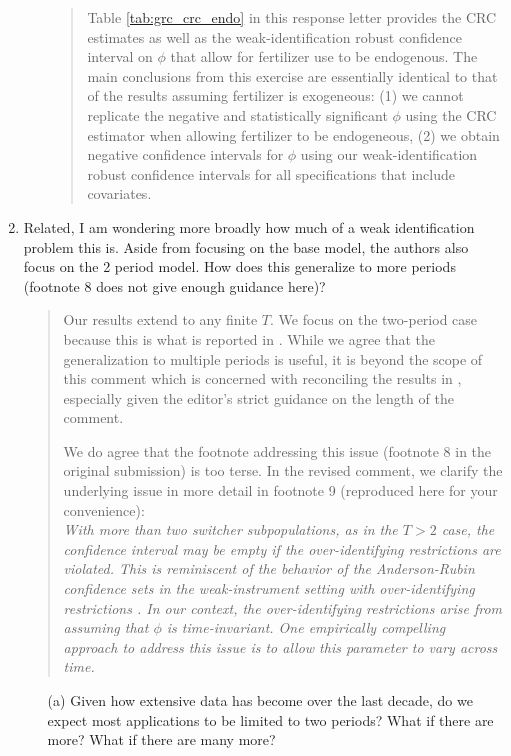 \documentclass{article}[11pt]
\begin{document}
\begin{enumerate}
\begin{itemize}
\begin{quote}
Table \ref{tab:grc_crc_endo} in this response letter provides the CRC estimates as well as the weak-identification robust confidence interval on $\phi$ that allow for fertilizer use to be endogenous. The main conclusions from this exercise are essentially identical to that of the results assuming fertilizer is exogeneous: (1) we cannot replicate the negative and statistically significant $\phi$ using the CRC estimator when allowing fertilizer to be endogeneous, (2) we obtain negative confidence intervals for $\phi$ using our weak-identification robust confidence intervals for all specifications that include covariates.
      \end{quote}
  \end{itemize}
  \item Related, I am wondering more broadly how much of a weak identification problem this is. Aside from focusing on the base model, the authors also focus on the 2 period model. How does this generalize to more periods (footnote 8 does not give enough guidance here)?
    \begin{quote}
        Our results extend to any finite $T$.
        We focus on the two-period case because this is what is reported in \citet{S2011}. While we agree that the generalization to multiple periods is useful, it is beyond the scope of this comment which is concerned with reconciling the results in \citet{S2011}, especially given the editor's strict guidance on the length of the comment. 
        \newline
    
        We do agree that the footnote addressing this issue (footnote 8 in the original submission) is too terse. 
        In the revised comment, we clarify the underlying issue in more detail in footnote 9 (reproduced here for your convenience):\\
        \emph{With more than two switcher subpopulations, as in the $T>2$ case, the confidence interval may be empty if the over-identifying restrictions are violated. This is reminiscent of the behavior of the Anderson-Rubin confidence sets in the weak-instrument setting with over-identifying restrictions \citep{ASS2019}. In our context, the over-identifying restrictions arise from assuming that $\phi$ is time-invariant. One empirically compelling approach to address this issue is to allow this parameter to vary across time.}
    \end{quote}
  
  \begin{itemize}
    \item[(a)] Given how extensive data has become over the last decade, do we expect most applications to be limited to two periods? What if there are more? What if there are many more? 
    \begin{quote}
    

\end{quote}
\end{itemize}
\end{enumerate}
\end{document}
